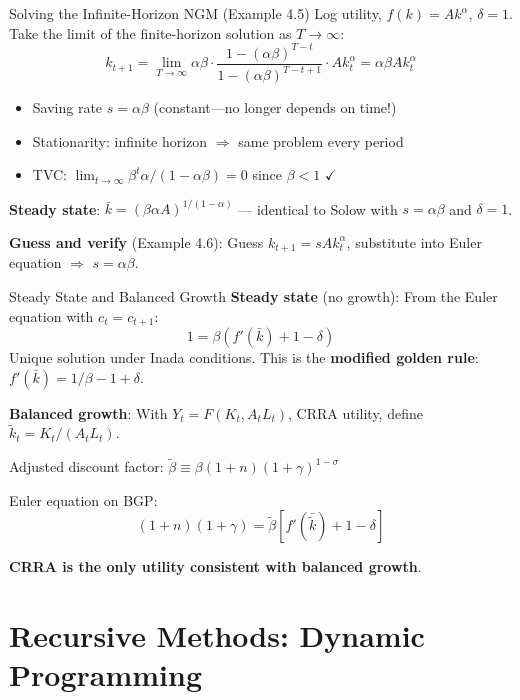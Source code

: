 \documentclass[blue]{beamer}
\begin{document}
\begin{frame}{Solving the Infinite-Horizon NGM (Example 4.5)}
	Log utility, $f(k) = Ak^\alpha$, $\delta = 1$. Take the limit of the finite-horizon solution as $T \to \infty$:
	\[
	k_{t+1} = \lim_{T \to \infty} \alpha\beta \cdot \frac{1-(\alpha\beta)^{T-t}}{1-(\alpha\beta)^{T-t+1}} \cdot Ak_t^\alpha = \alpha\beta A k_t^\alpha
	\]
	
	\begin{itemize}
		\item Saving rate $s = \alpha\beta$ (constant---no longer depends on time!)
		\item Stationarity: infinite horizon $\Rightarrow$ same problem every period
		\item TVC: $\lim_{t \to \infty} \beta^t \alpha/(1-\alpha\beta) = 0$ since $\beta < 1$ $\checkmark$
	\end{itemize}
	
	\bigskip
	\textbf{Steady state}: $\bar{k} = (\beta\alpha A)^{1/(1-\alpha)}$ --- identical to Solow with $s = \alpha\beta$ and $\delta = 1$.
	
	\bigskip
	\textbf{Guess and verify} (Example 4.6): Guess $k_{t+1} = sAk_t^\alpha$, substitute into Euler equation $\Rightarrow$ $s = \alpha\beta$.
\end{frame}

\begin{frame}{Steady State and Balanced Growth}
	\textbf{Steady state} (no growth): From the Euler equation with $c_t = c_{t+1}$:
	\[
	1 = \beta(f'(\bar{k}) + 1 - \delta)
	\]
	Unique solution under Inada conditions. This is the \textbf{modified golden rule}: $f'(\bar{k}) = 1/\beta - 1 + \delta$.

	\textbf{Balanced growth}: With $Y_t = F(K_t, A_t L_t)$, CRRA utility, define $\tilde{k}_t = K_t/(A_t L_t)$.
	
	Adjusted discount factor: $\tilde{\beta} \equiv \beta(1+n)(1+\gamma)^{1-\sigma}$
	

	Euler equation on BGP:
	\[
	(1+n)(1+\gamma) = \tilde{\beta}[f'(\bar{\tilde{k}}) + 1 - \delta]
	\]
	
	\textbf{CRRA is the only utility consistent with balanced growth}.
\end{frame}


\section{Recursive Methods: Dynamic Programming}
\end{document}
